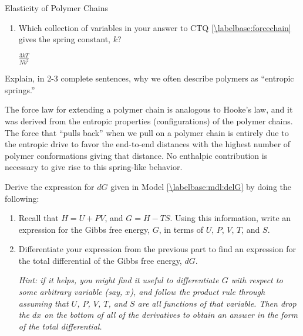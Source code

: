 \begin{activity}{Elasticity of Polymer Chains}
\begin{ctqs}
\begin{enumerate}
			\item Which collection of variables in your answer to CTQ \ref{\labelbase:forcechain} gives the spring constant, $k$?
		
				\begin{solution}[0.75in]
					$\frac{3kT}{Nb^2}$
				\end{solution}
			
		\end{enumerate}
		
	\question Explain, in 2-3 complete sentences, why we often describe polymers as ``entropic springs.''
	
		\begin{solution}[2.5in]
			The force law for extending a polymer chain is analogous to Hooke's law, and it was derived from the entropic properties (configurations) of the polymer chains.  The force that ``pulls back'' when we pull on a polymer chain is entirely due to the entropic drive to favor the end-to-end distances with the highest number of polymer conformations giving that distance.  No enthalpic contribution is necessary to give rise to this spring-like behavior.
		\end{solution}
	
\end{ctqs}
	
	
\begin{exercises}
	\exercise \label{\labelbase:exc:dG} Derive the expression for $dG$ given in Model \ref{\labelbase:mdl:delG} by doing the following:
	
		\begin{enumerate}
			\item Recall that $H = U+ PV$, and $G=H-TS$.  Using this information, write an expression for the Gibbs free energy, $G$, in terms of $U$, $P$, $V$, $T$, and $S$.
			
				\begin{solution}\end{solution}
			
			\item Differentiate your expression from the previous part to find an expression for the total differential of the Gibbs free energy, $dG$.
			
				\emph{Hint: if it helps, you might find it useful to differentiate $G$ with respect to some arbitrary variable (say, $x$), and follow the product rule through assuming that $U$, $P$, $V$, $T$, and $S$ are all functions of that variable.  Then drop the $dx$ on the bottom of all of the derivatives to obtain an answer in the form of the total differential.}
			

\end{enumerate}
\end{exercises}
\end{activity}
